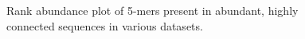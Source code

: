\documentclass[10pt]{article}
\begin{document}

\begin{figure}[h]
\caption{Rank abundance plot of 5-mers present in abundant, highly connected sequences in various datasets.}
\label{five-mer}
\end{figure}
\end{document}
